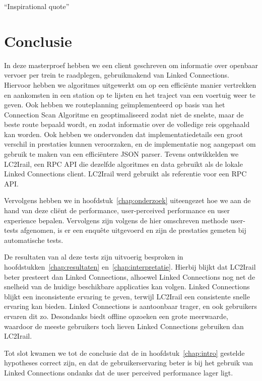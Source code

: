 \begin{savequote}[0.55\linewidth]
	``Inspirational quote''
\end{savequote}

\chapter{Conclusie}

In deze masterproef hebben we een client geschreven om informatie over openbaar vervoer per trein te raadplegen, gebruikmakend van Linked Connections. Hiervoor hebben we algoritmes uitgewerkt om op een efficiënte manier vertrekken en aankomsten in een station op te lijsten en het traject van een voertuig weer te geven. Ook hebben we routeplanning geïmplementeerd op basis van het Connection Scan Algoritme en geoptimaliseerd zodat niet de snelste, maar de beste route bepaald wordt, en zodat informatie over de volledige reis opgehaald kan worden. Ook hebben we ondervonden dat implementatiedetails een groot verschil in prestaties kunnen veroorzaken, en de implementatie nog aangepast om gebruik te maken van een efficiëntere JSON parser. Tevens ontwikkelden we LC2Irail, een RPC API die dezelfde algoritmes en data gebruikt als de lokale Linked Connections client. LC2Irail werd gebruikt als referentie voor een RPC API.

Vervolgens hebben we in hoofdstuk~\ref{chap:onderzoek} uiteengezet hoe we aan de hand van deze cliënt de performance, user-perceived performance en user experience bepalen. Vervolgens zijn volgens de hier omschreven methode user-tests afgenomen, is er een enquête uitgevoerd en zijn de prestaties gemeten bij automatische tests. 

De resultaten van al deze tests zijn uitvoerig besproken in hoofdstukken~\ref{chap:resultaten} en~\ref{chap:interpretatie}. Hierbij blijkt dat LC2Irail beter presteert dan Linked Connections, alhoewel Linked Connections nog net de snelheid van de huidige beschikbare applicaties kan volgen. Linked Connections blijkt een inconsistente ervaring te geven, terwijl LC2Irail een consistente snelle ervaring kan bieden. Linked Connections is aantoonbaar trager, en ook gebruikers ervaren dit zo. Desondanks biedt offline opzoeken een grote meerwaarde, waardoor de meeste gebruikers toch lieven Linked Connections gebruiken dan LC2Irail.

Tot slot kwamen we tot de conclusie dat de in hoofdstuk~\ref{chap:intro} gestelde hypotheses correct zijn, en dat de gebruikerservaring beter is bij het gebruik van Linked Connections ondanks dat de user perceived performance lager ligt.